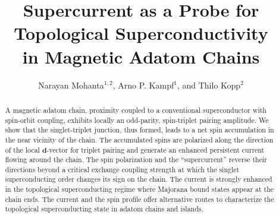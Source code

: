 \documentclass[aps,prl,reprint,nobibnotes]{revtex4-1}
\begin{document}
\title{Supercurrent as a Probe for Topological Superconductivity \\ in Magnetic Adatom Chains}


\author{Narayan Mohanta$^{1,2}$, Arno P. Kampf$^{1}$, and Thilo Kopp$^{2}$}

\begin{abstract}
A magnetic adatom chain, proximity coupled to a conventional superconductor with spin-orbit coupling, exhibits locally an odd-parity, spin-triplet pairing amplitude. We show that the singlet-triplet junction, thus formed, leads to a net spin accumulation in the near vicinity of the chain. The accumulated spins are polarized along the direction of the local $\mathbf{d}$-vector for triplet pairing and generate an enhanced  persistent current flowing around the chain. The spin polarization and the ``supercurrent'' reverse their directions beyond a critical exchange coupling strength at which the singlet superconducting order changes its sign on the chain. The current is strongly enhanced in the topological superconducting regime where Majorana bound states appear at the chain ends. The current and the spin profile offer alternative routes to characterize the topological superconducting state in adatom chains and islands.
\end{abstract}
           
\maketitle
\end{document}
